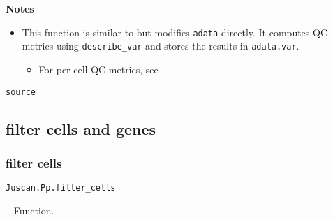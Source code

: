 \documentclass[oneside]{memoir}
\begin{document}
\begin{adjustwidth}{2em}{0pt}
\begin{itemize}
\end{itemize}
\textbf{Notes}

\begin{itemize}
\item This function is similar to  but modifies \texttt{adata} directly.   It computes QC metrics using \texttt{describe\_var} and stores the results in \texttt{adata.var}.  

\begin{itemize}
\item For per-cell QC metrics, see .

\end{itemize}
\end{itemize}


\href{https://github.com/zehua0417/Juscan.jl/blob/393ad1b827b678ea98a738f92af658ee9ed9a403/src/preprocessing/qc.jl#L455-L485}{\texttt{source}}


\end{adjustwidth}

\subsection{filter cells and genes}



\label{13485755474141135561}{}


\subsubsection{filter cells}



\label{13029337999560467416}{}

\hypertarget{9396744289236617891}{\texttt{Juscan.Pp.filter\_cells}}  -- {Function.}
\end{document}
